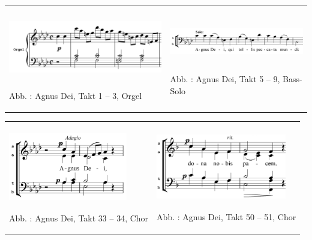 \begin{flushleft}
\tablefirsthead{}
\tablehead{}
\tabletail{}
\tablelasttail{}
\begin{supertabular}{m{7.676cm}m{6.372cm}}

\includegraphics[width=7.493cm,height=2.828cm]{pictures/zulassungsarbeit-img115.png}

Abb. : Agnus Dei, Takt 1 – 3, Orgel &

\includegraphics[width=6.018cm,height=1.85cm]{pictures/zulassungsarbeit-img116.png}

Abb. : Agnus Dei, Takt 5 – 9, Bass-Solo\\
\end{supertabular}
\end{flushleft}
\begin{flushleft}
\tablefirsthead{}
\tablehead{}
\tabletail{}
\tablelasttail{}
\begin{supertabular}{m{5.3650002cm}m{5.875cm}}

\includegraphics[width=5.182cm,height=3.087cm]{pictures/zulassungsarbeit-img117.png}

Abb. : Agnus Dei, Takt 33 – 34, Chor &

\includegraphics[width=5.692cm,height=2.972cm]{pictures/zulassungsarbeit-img118.png}

Abb. : Agnus Dei, Takt 50 – 51, Chor\\
\end{supertabular}
\end{flushleft}
